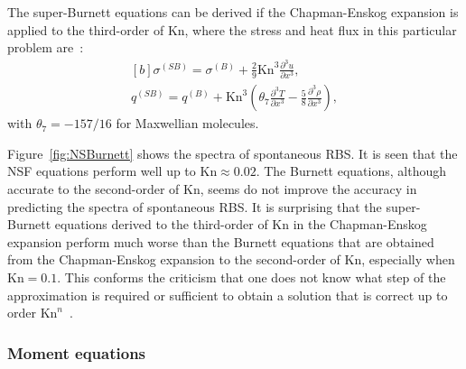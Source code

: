 The super-Burnett equations can be derived if the Chapman-Enskog expansion is applied to the third-order of $\text{Kn}$, where the stress and heat flux in this particular problem are~\cite{Shavaliyev1993}:
\begin{equation}\label{SB}
\begin{aligned}[b]
\sigma^{(SB)}=\sigma^{(B)}+\frac{2}{9}\text{Kn}^3\frac{\partial^3 u}{\partial x^3},\\
q^{(SB)}=q^{(B)}+\text{Kn}^3\left(\theta_7\frac{\partial^3T}{\partial x^3}-\frac{5}{8}\frac{\partial^3\rho}{\partial x^3}\right),
\end{aligned}
\end{equation}
with $\theta_7=-{157}/{16}$ for Maxwellian molecules. 




Figure~\ref{fig:NSBurnett} shows the spectra of spontaneous RBS. It is seen that the NSF equations perform well up to $\text{Kn}\approx0.02$. The Burnett equations, although accurate to the second-order of $\text{Kn}$, seems do not improve the accuracy in predicting the spectra of spontaneous RBS. It is surprising that the super-Burnett equations derived to the third-order of $\text{Kn}$ in the Chapman-Enskog expansion perform much worse than the Burnett equations that are obtained from the Chapman-Enskog expansion to the second-order of $\text{Kn}$, especially when $\text{Kn}=0.1$. This conforms the criticism that one does not know what step of the approximation is required or sufficient to obtain a solution that is correct up to order $\text{Kn}^n$~\cite{Cercignanibook1988,Sone2002Book}. 




\subsubsection{Moment equations}

